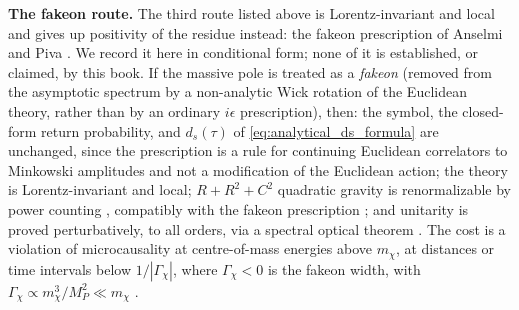 \documentclass[11pt,a4paper,reqno]{amsart}
\theoremstyle{definition}
\numberwithin{equation}{section}
\begin{document}
\textbf{The fakeon route.} The third route listed above is Lorentz-invariant and local and gives up positivity of the residue instead: the fakeon prescription of Anselmi and Piva \cite{Anselmi2018, AnselmiPiva2018, Anselmi2021}. We record it here in conditional form; none of it is established, or claimed, by this book. If the massive pole is treated as a \emph{fakeon} (removed from the asymptotic spectrum by a non-analytic Wick rotation of the Euclidean theory, rather than by an ordinary $i\epsilon$ prescription), then: the symbol, the closed-form return probability, and $d_s(\tau)$ of \eqref{eq:analytical_ds_formula} are unchanged, since the prescription is a rule for continuing Euclidean correlators to Minkowski amplitudes and not a modification of the Euclidean action; the theory is Lorentz-invariant and local; $R + R^2 + C^2$ quadratic gravity is renormalizable by power counting \cite{Stelle1977}, compatibly with the fakeon prescription \cite{ABP2020}; and unitarity is proved perturbatively, to all orders, via a spectral optical theorem \cite{Anselmi2021}. The cost is a violation of microcausality at centre-of-mass energies above $m_\chi$, at distances or time intervals below $1/|\Gamma_\chi|$, where $\Gamma_\chi < 0$ is the fakeon width, with $\Gamma_\chi \propto m_\chi^3/M_P^2 \ll m_\chi$ \cite{AnselmiPiva2018}.
\end{document}
